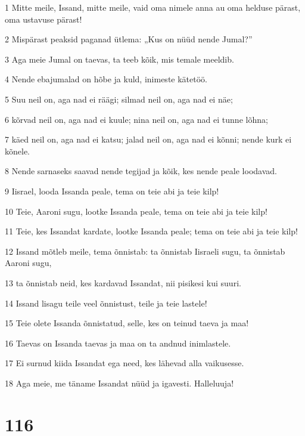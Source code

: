 \par 1 Mitte meile, Issand, mitte meile, vaid oma nimele anna au oma helduse pärast, oma ustavuse pärast!
\par 2 Mispärast peaksid paganad ütlema: „Kus on nüüd nende Jumal?”
\par 3 Aga meie Jumal on taevas, ta teeb kõik, mis temale meeldib.
\par 4 Nende ebajumalad on hõbe ja kuld, inimeste kätetöö.
\par 5 Suu neil on, aga nad ei räägi; silmad neil on, aga nad ei näe;
\par 6 kõrvad neil on, aga nad ei kuule; nina neil on, aga nad ei tunne lõhna;
\par 7 käed neil on, aga nad ei katsu; jalad neil on, aga nad ei kõnni; nende kurk ei kõnele.
\par 8 Nende sarnaseks saavad nende tegijad ja kõik, kes nende peale loodavad.
\par 9 Iisrael, looda Issanda peale, tema on teie abi ja teie kilp!
\par 10 Teie, Aaroni sugu, lootke Issanda peale, tema on teie abi ja teie kilp!
\par 11 Teie, kes Issandat kardate, lootke Issanda peale; tema on teie abi ja teie kilp!
\par 12 Issand mõtleb meile, tema õnnistab: ta õnnistab Iisraeli sugu, ta õnnistab Aaroni sugu,
\par 13 ta õnnistab neid, kes kardavad Issandat, nii pisikesi kui suuri.
\par 14 Issand lisagu teile veel õnnistust, teile ja teie lastele!
\par 15 Teie olete Issanda õnnistatud, selle, kes on teinud taeva ja maa!
\par 16 Taevas on Issanda taevas ja maa on ta andnud inimlastele.
\par 17 Ei surnud kiida Issandat ega need, kes lähevad alla vaikusesse.
\par 18 Aga meie, me täname Issandat nüüd ja igavesti. Halleluuja!

\chapter{116}

